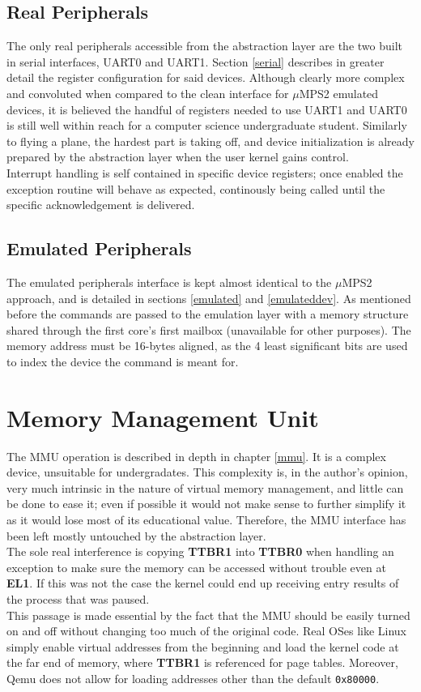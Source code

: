 \documentclass[12pt,a4paper,openright,twoside]{report}
\begin{document}
\subsection{Real Peripherals}
The only real peripherals accessible from the abstraction layer are the two 
built in serial interfaces, UART0 and UART1.
Section \ref{serial} describes in greater detail the register configuration for
said devices. Although clearly more complex and convoluted when compared to the
clean interface for $\mu$MPS2 emulated devices, it is believed the handful of 
registers needed to use UART1 and UART0 is still well within reach for a computer
science undergraduate student. Similarly to flying a plane, the hardest
part is taking off, and device initialization is already prepared by the abstraction
layer when the user kernel gains control.\\
Interrupt handling is self contained in specific device registers; once enabled
the exception routine will behave as expected, continously being called until 
the specific acknowledgement is delivered.

\subsection{Emulated Peripherals}
The emulated peripherals interface is kept almost identical to the $\mu$MPS2 
approach, and is detailed in sections \ref{emulated} and \ref{emulateddev}.
As mentioned before the commands are passed to the emulation layer with a memory
structure shared through the first core's first mailbox (unavailable for other
purposes). The memory address must be 16-bytes aligned, as the 4 least significant
bits are used to index the device the command is meant for.

\section{Memory Management Unit}
The MMU operation is described in depth in chapter \ref{mmu}. It is a complex 
device, unsuitable for undergradates. This complexity is, in the author's opinion,
very much intrinsic in the nature of virtual memory management, and little can
be done to ease it; even if possible it would not make sense to further simplify it as 
it would lose most of its educational value.
Therefore, the MMU interface has been left mostly untouched by the abstraction layer.\\
The sole real interference is copying \textbf{TTBR1} into \textbf{TTBR0} when 
handling an exception to make sure the memory can be accessed without trouble 
even at \textbf{EL1}. If this was not the case the kernel could end up receiving 
entry results of the process that was paused.\\
This passage is made essential by the fact that the MMU should be easily turned
on and off without changing too much of the original code. Real OSes like
Linux simply enable virtual addresses from the beginning and load the kernel
code at the far end of memory, where \textbf{TTBR1} is referenced for page tables.
Moreover, Qemu does not allow for loading addresses other than the default 
{\tt 0x80000}. \\
\end{document}
